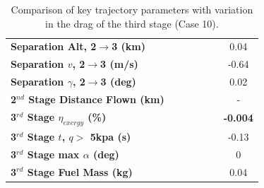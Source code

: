 \begin{table}[ht]
\begin{tabular}{l c c c c c c}
		\textbf{Separation Alt, 2$\rightarrow$3 (km)}
		& \secondthirdSeparationAltCdThreeEightyNoReturn
		& \secondthirdSeparationAltCdThreeNinetyNoReturn
		& \secondthirdSeparationAltCdThreeStandardNoReturn
		& \secondthirdSeparationAltCdThreeOneHundredTenNoReturn
		& \secondthirdSeparationAltCdThreeOneHundredTwentyNoReturn
		&0.04
		\\
		\textbf{Separation $v$, 2$\rightarrow$3 (m/s)}
		& \secondthirdSeparationvCdThreeEightyNoReturn
		& \secondthirdSeparationvCdThreeNinetyNoReturn
		& \secondthirdSeparationvCdThreeStandardNoReturn
		& \secondthirdSeparationvCdThreeOneHundredTenNoReturn
		& \secondthirdSeparationvCdThreeOneHundredTwentyNoReturn
		&-0.64
		\\
		\textbf{Separation $\gamma$, 2$\rightarrow$3 (deg)}
		& \secondthirdSeparationgammaCdThreeEightyNoReturn
		& \secondthirdSeparationgammaCdThreeNinetyNoReturn
		& \secondthirdSeparationgammaCdThreeStandardNoReturn
		& \secondthirdSeparationgammaCdThreeOneHundredTenNoReturn
		& \secondthirdSeparationgammaCdThreeOneHundredTwentyNoReturn
		&0.02
		\\
	
		\textbf{2$^{nd}$ Stage Distance Flown (km)}
		& \SecondDistCdThreeEightyNoReturn
		& \SecondDistCdThreeNinetyNoReturn
		& \SecondDistCdThreeStandardNoReturn
		& \SecondDistCdThreeOneHundredTenNoReturn
		& \SecondDistCdThreeOneHundredTwentyNoReturn
		& -
		\\
		\hline 
		\textbf{3$^{rd}$ Stage $\eta_{exergy}$ (\%)}
		& \textbf{\thirddExergyEffCdThreeEightyNoReturn}
		& \textbf{\thirddExergyEffCdThreeNinetyNoReturn}
		& \textbf{\thirddExergyEffCdThreeStandardNoReturn}
		& \textbf{\thirddExergyEffCdThreeOneHundredTenNoReturn}
		& \textbf{\thirddExergyEffCdThreeOneHundredTwentyNoReturn}
		& \textbf{-0.004}
		\\
	
		\textbf{3$^{rd}$ Stage $t$, $q >$ 5kpa (s)}
		& \thirdqOverFiveCdThreeEightyNoReturn
		& \thirdqOverFiveCdThreeNinetyNoReturn
		& \thirdqOverFiveCdThreeStandardNoReturn
		& \thirdqOverFiveCdThreeOneHundredTenNoReturn
		& \thirdqOverFiveCdThreeOneHundredTwentyNoReturn
		&-0.13
		\\
		\textbf{3$^{rd}$ Stage max $\alpha$ (deg)}
		& \thirdmaxAoACdThreeEightyNoReturn
		& \thirdmaxAoACdThreeNinetyNoReturn
		& \thirdmaxAoACdThreeStandardNoReturn
		& \thirdmaxAoACdThreeOneHundredTenNoReturn
		& \thirdmaxAoACdThreeOneHundredTwentyNoReturn
		&0
		\\
		\textbf{3$^{rd}$ Stage Fuel Mass (kg)}
		& \thirdmFuelCdThreeEightyNoReturn
		& \thirdmFuelCdThreeNinetyNoReturn
		& \thirdmFuelCdThreeStandardNoReturn
		& \thirdmFuelCdThreeOneHundredTenNoReturn
		& \thirdmFuelCdThreeOneHundredTwentyNoReturn
		&0.04
		\\
		\hline 
	\end{tabular} 
	\caption{Comparison of key trajectory parameters with variation in the drag of the third stage (Case 10).}
	\label{tab:comparison70}
	
\end{table}

